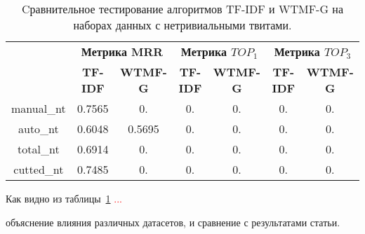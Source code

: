    \begin{table}[ht!]
    \caption{Cравнительное тестирование алгоритмов TF-IDF и WTMF-G на наборах данных с нетривиальными твитами. \bigskip}
    \centering

    \label{tabular:tfidf_wmtfg_nt}
        \begin{tabular}{|c|c|c|c|c|c|c|}
            \hline
            \bf{\multirow{2}{*}{\specialcell{Набор данных}}} &
            \multicolumn{2}{|c|}{\bf{Метрика MRR}} &
            \multicolumn{2}{|c|}{\bf{Метрика $TOP_1$}} &
            \multicolumn{2}{|c|}{\bf{Метрика $TOP_3$}} \\ \cline{2-7}
            & \bf{TF-IDF} & \bf{WTMF-G} & \bf{TF-IDF} & \bf{WTMF-G} & \bf{TF-IDF} & \bf{WTMF-G} \\ \hline
            manual\_nt & 0.7565 & 0. & 0. & 0. & 0. & 0. \\ \hline
            auto\_nt & 0.6048 & 0.5695 & 0. & 0. & 0. & 0. \\ \hline
            total\_nt & 0.6914 & 0. & 0. & 0. & 0. & 0. \\ \hline
            cutted\_nt & 0.7485 & 0. & 0. & 0. & 0. & 0. \\ \hline
        \end{tabular}
    \end{table}
    Как видно из таблицы~\ref{tabular:tfidf_wmtfg_nt} \textcolor{red}{...}

        объяснение влияния различных датасетов, и сравнение с результатами статьи.

